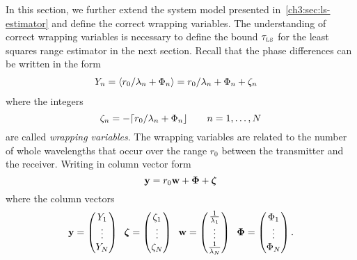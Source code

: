 %
In this section, we further extend the system model presented in~\ref{ch3:sec:ls-estimator} and define the correct wrapping variables. The understanding of correct wrapping variables is necessary to define the bound $\tau_{\text{\tiny{LS}}}$ for the least squares range estimator in the next section. Recall that the phase differences can be written in the form 
\begin{align*}
Y_n &=  \left\langle  r_0/\lambda_n + \Phi_n \right\rangle =  r_0/\lambda_n + \Phi_n + \zeta_n
\end{align*}
where the integers
\[
\zeta_n = -{\left\lceil r_0/\lambda_n + \Phi_n \right\rfloor} \qquad n = 1 ,\dots, N 
\]
are called \emph{wrapping variables}. The wrapping variables are related to the number of whole wavelengths that occur over the range $r_0$ between the transmitter and the receiver.  Writing in column vector form
\begin{equation}\label{ch4:eq:Yndefn_vecform}
\mathbf{y} = r_0\mathbf{w} + \boldsymbol{\Phi} + \boldsymbol{\zeta}
\end{equation}
where the column vectors
\[
\mathbf{y} = \left(\begin{matrix} Y_1 \\ \vdots \\ Y_N \end{matrix}\right)  \;\; 
\boldsymbol{\zeta} = \left( \begin{matrix} \zeta_1 \\ \vdots \\ \zeta_N \end{matrix}\right) \;\;
\mathbf{w} = \left( \begin{matrix} \frac{1}{\lambda_1} \\ \vdots \\ \frac{1}{\lambda_N} \end{matrix} \right) \;\; 
\boldsymbol{\Phi} = \left( \begin{matrix} \Phi_1 \\ \vdots \\ \Phi_N \end{matrix} \right) .
\]
